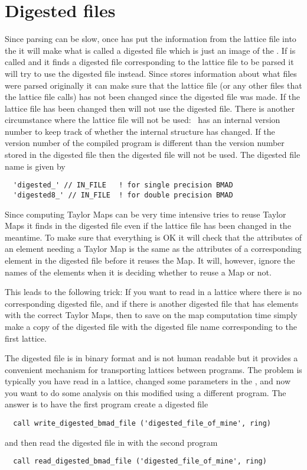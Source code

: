 \section{Digested files}

Since parsing can be slow, once  has put the information
from the lattice file into the  it will make what is
called a digested file which is just an image of the .  If
 is called and it finds a digested file corresponding to
the lattice file to be parsed it will try to use the digested file
instead. Since  stores information about what files were
parsed originally it can make sure that the lattice file (or any other
files that the lattice file calls) has not been changed since the
digested file was made. If the lattice file has been changed then
 will not use the digested file. There is another 
circumstance where the lattice file will not be used: \bmad\ has an
internal version number to keep track of whether the 
internal structure has changed. If the version number of the compiled
program is different than the version number stored in the digested
file then the digested file will not be used. The digested file name
is given by
\begin{verbatim}
  'digested_' // IN_FILE   ! for single precision BMAD 
  'digested8_' // IN_FILE  ! for double precision BMAD 
\end{verbatim}

Since computing Taylor Maps can be very time intensive 
tries to reuse Taylor Maps it finds in the digested file even if the
lattice file has been changed in the meantime. To make sure that
everything is OK it will check that the attributes of an element
needing a Taylor Map is the same as the attributes of a corresponding
element in the digested file before it reuses the Map. It will,
however, ignore the names of the elements when it is deciding whether
to reuse a Map or not. 

This leads to the following trick: If you want to read in a lattice
where there is no corresponding digested file, and if there is another
digested file that has elements with the correct Taylor Maps, then to
save on the map computation time simply make a copy of the digested
file with the digested file name corresponding to the first lattice.

The digested file is in binary format and is not human readable but it
provides a convenient mechanism for transporting lattices between
programs. The problem is typically you have read in a lattice, changed
some parameters in the , and now you want to do some
analysis on this modified  using a different program. The 
answer is to have the first program create a digested file
\begin{verbatim}
  call write_digested_bmad_file ('digested_file_of_mine', ring)
\end{verbatim}
and then read the digested file in with the second program
\begin{verbatim}
  call read_digested_bmad_file ('digested_file_of_mine', ring)
\end{verbatim}